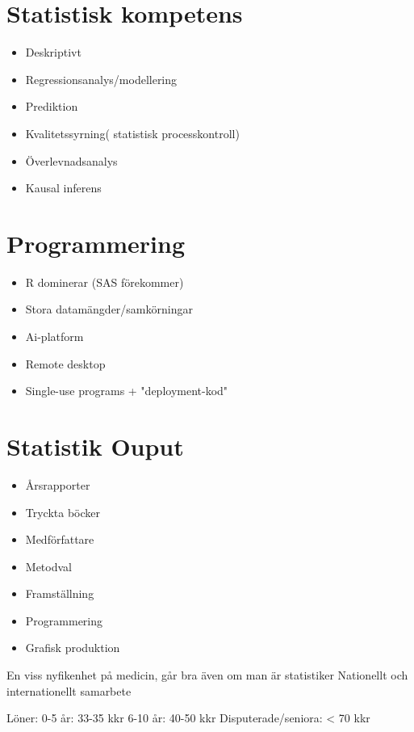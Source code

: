 \section{Statistisk kompetens}
\begin{itemize}
	\item Deskriptivt
	\item Regressionsanalys/modellering
	\item Prediktion
	\item Kvalitetssyrning( statistisk processkontroll)
	\item Överlevnadsanalys
	\item Kausal inferens
\end{itemize}

\section{Programmering}
\begin{itemize}
	\item R dominerar (SAS förekommer)
	\item Stora datamängder/samkörningar
	\item Ai-platform
	\item Remote desktop
	\item Single-use programs + "deployment-kod"
\end{itemize}

\section{Statistik Ouput}
\begin{itemize}
	\item Årsrapporter
	\item Tryckta böcker
	\item Medförfattare
	\item Metodval
	\item Framställning
	\item Programmering
	\item Grafisk produktion
\end{itemize}
En viss nyfikenhet på medicin, går bra även om man är statistiker
Nationellt och internationellt samarbete

Löner:
0-5 år: 33-35 kkr
6-10 år: 40-50 kkr
Disputerade/seniora: < 70 kkr
